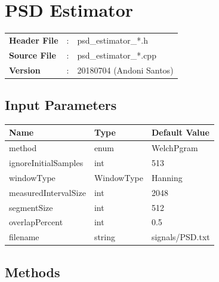 \clearpage

\section{PSD Estimator}

\begin{refsection}

\begin{tcolorbox}	
	\begin{tabular}{p{2.75cm} p{0.2cm} p{10.5cm}} 	
		\textbf{Header File}   &:& psd\_estimator\_*.h \\
		\textbf{Source File}   &:& psd\_estimator\_*.cpp \\
		\textbf{Version}	   &:& 20180704 (Andoni Santos)
	\end{tabular}
\end{tcolorbox}

\subsection*{Input Parameters}

\begin{table}[H]
	\centering
	\begin{tabular}{|l|l|l|}
		\hline
		\textbf{Name}  		 & \textbf{Type}  & \textbf{Default Value}    	\\\hline
		method				& enum				& WelchPgram			\\\hline
		ignoreInitialSamples & int				& 513					\\\hline
		windowType			 & WindowType     & Hanning			  	\\\hline
		measuredIntervalSize & int 			  & 2048				\\\hline
		segmentSize			 & int			  & 512					\\\hline
		overlapPercent 		 & int			  & 0.5					\\\hline
		filename			& string			& signals/PSD.txt	\\\hline
	\end{tabular}
\end{table}


\subsection*{Methods}


\end{refsection}
